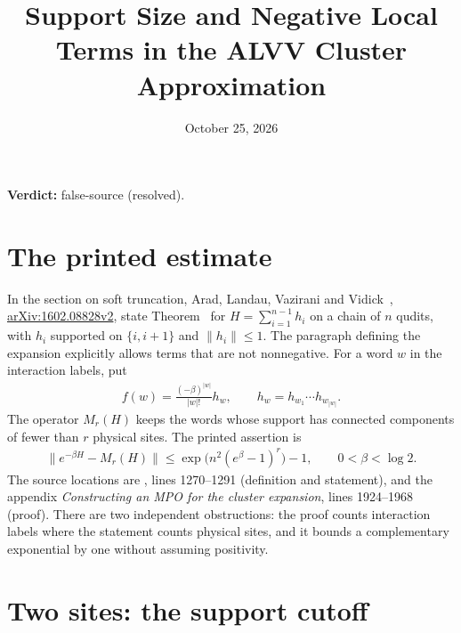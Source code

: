 \documentclass{article}
\title{Support Size and Negative Local Terms in the ALVV Cluster Approximation}
\author{}
\date{October 25, 2026}
\providecommand{\gapnote}[2]{\par\noindent\textbf{Verdict:} #1 (#2).\par}
\begin{document}
\maketitle
\gapnote{false-source}{resolved}

\section{The printed estimate}

In the section on soft truncation, Arad, Landau, Vazirani and
Vidick~\cite{Arad2016RigorousRG},
\href{https://arxiv.org/abs/1602.08828v2}{arXiv:1602.08828v2}, state
Theorem~ for
$H=\sum_{i=1}^{n-1}h_i$ on a chain of $n$ qudits, with $h_i$ supported on
$\{i,i+1\}$ and $\|h_i\|\le1$. The paragraph defining the expansion explicitly
allows terms that are not nonnegative. For a word $w$ in the interaction
labels, put
\begin{align}
    f(w)=\frac{(-\beta)^{|w|}}{|w|!}h_w,
    \qquad h_w=h_{w_1}\cdots h_{w_{|w|}}.
    \label{eq:alvv_cluster_word}
\end{align}
The operator $M_r(H)$ keeps the words whose support has connected components
of fewer than $r$ physical sites. The printed assertion is
\begin{align}
    \|e^{-\beta H}-M_r(H)\|
    \le \exp\bigl(n^2(e^\beta-1)^r\bigr)-1,
    \qquad 0<\beta<\log2.
    \label{eq:alvv_cluster_printed}
\end{align}
The source locations are , lines 1270--1291
(definition and statement), and the appendix \emph{Constructing an MPO for the
    cluster expansion}, lines 1924--1968 (proof).
There are two independent obstructions: the proof counts interaction labels
where the statement counts physical sites, and it bounds a complementary
exponential by one without assuming positivity.

\section{Two sites: the support cutoff}
\end{document}
